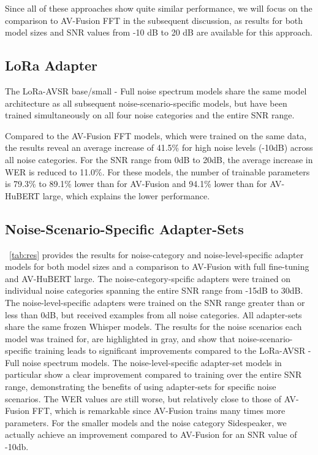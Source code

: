 Since all of these approaches show quite similar performance, we will focus on the comparison to AV-Fusion FFT in the subsequent discussion, as results for both model sizes and SNR values from -10 dB to 20 dB are available for this approach.

\subsection{LoRa Adapter}

The LoRa-AVSR base/small - Full noise spectrum models share the same model architecture as all subsequent noise-scenario-specific models, but have been trained simultaneously on all four noise categories and the entire SNR range.

Compared to the AV-Fusion FFT models, which were trained on the same data, the results reveal an average increase of 41.5\% for high noise levels (-10dB) across all noise categories. For the SNR range from 0dB to 20dB, the average increase in WER is reduced to 11.0\%. 
For these models, the number of trainable parameters is 79.3\% to 89.1\% lower than for AV-Fusion and 94.1\% lower than for AV-HuBERT large, which explains the lower performance.


\subsection{Noise-Scenario-Specific Adapter-Sets}

\tablename~\ref{tab:res} provides the results for noise-category and noise-level-specific adapter models for both model sizes and a comparison to AV-Fusion with full fine-tuning and AV-HuBERT large.
The noise-category-spcific adapters were trained on individual noise categories spanning the entire SNR range from -15dB to 30dB. The noise-level-specific adapters were trained on the SNR range greater than or less than 0dB, but received examples from all noise categories. All adapter-sets share the same frozen Whisper models.
The results for the noise scenarios each model was trained for, are highlighted in gray, and show that noise-scenario-specific training leads to significant improvements compared to the LoRa-AVSR - Full noise spectrum models. The noise-level-specific adapter-set models in particular show a clear improvement compared to training over the entire SNR range, demonstrating the benefits of using adapter-sets for specific noise scenarios. 
The WER values are still worse, but relatively close to those of AV-Fusion FFT, which is remarkable since AV-Fusion trains many times more parameters. For the smaller models and the noise category Sidespeaker, we actually achieve an improvement compared to AV-Fusion for an SNR value of -10db.

